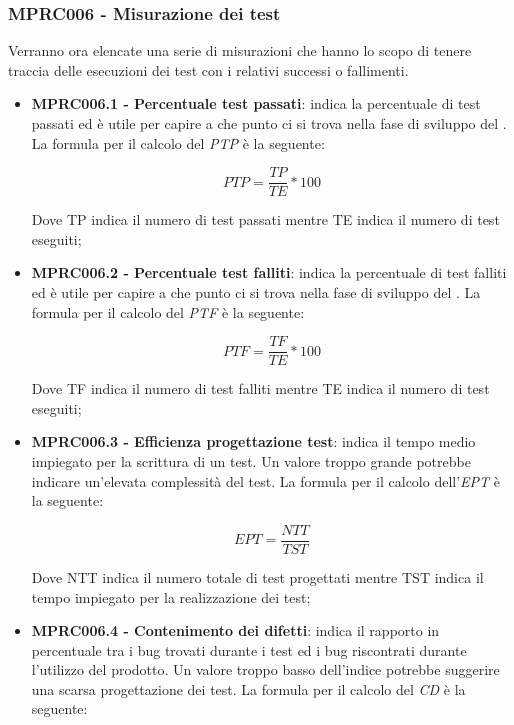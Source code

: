 {\subsubsection{MPRC006 - Misurazione dei test}
Verranno ora elencate una serie di misurazioni che hanno lo scopo di tenere traccia delle esecuzioni dei test con i relativi successi o fallimenti.
\begin{itemize}
    \item \textbf{MPRC006.1 - Percentuale test passati}: indica la percentuale di test passati ed è utile per capire a che punto ci si trova nella fase di sviluppo del . La formula per il calcolo del \textit{PTP} è la seguente:
    \begin{center}
        \begin{displaymath}
            PTP = \frac{TP}{TE} * 100
        \end{displaymath}
    \end{center}
    Dove TP indica il numero di test passati mentre TE indica il numero di test eseguiti;
    \item \textbf{MPRC006.2 - Percentuale test falliti}: indica la percentuale di test falliti ed è utile per capire a che punto ci si trova nella fase di sviluppo del . La formula per il calcolo del \textit{PTF} è la seguente:
    \begin{center}
        \begin{displaymath}
            PTF = \frac{TF}{TE} * 100
        \end{displaymath}
    \end{center}
    Dove TF indica il numero di test falliti mentre TE indica il numero di test eseguiti;
    \item \textbf{MPRC006.3 - Efficienza progettazione test}: indica il tempo medio impiegato per la scrittura di un test. Un valore troppo grande potrebbe indicare un'elevata complessità del test. La formula per il calcolo dell'\textit{EPT} è la seguente:
    \begin{center}
        \begin{displaymath}
            EPT = \frac{NTT}{TST}
        \end{displaymath}
    \end{center}
    Dove NTT indica il numero totale di test progettati mentre TST indica il tempo impiegato per la realizzazione dei test;
    \item \textbf{MPRC006.4 - Contenimento dei difetti}: indica il rapporto in percentuale tra i bug trovati durante i test ed i bug riscontrati durante l'utilizzo del prodotto. Un valore troppo basso dell'indice potrebbe suggerire una scarsa progettazione dei test. La formula per il calcolo del \textit{CD} è la seguente:

\end{itemize}}
